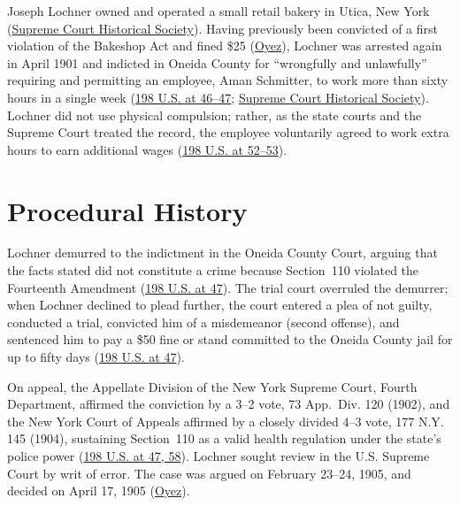 \documentclass[12pt]{article}
\begin{document}
Joseph Lochner owned and operated a small retail bakery in Utica, New York (\href{https://civics.supremecourthistory.org/article/lochner-v-new-york/}{Supreme Court Historical Society}). Having previously been convicted of a first violation of the Bakeshop Act and fined \$25 (\href{https://www.oyez.org/cases/1900-1940/198us45}{Oyez}), Lochner was arrested again in April 1901 and indicted in Oneida County for ``wrongfully and unlawfully'' requiring and permitting an employee, Aman Schmitter, to work more than sixty hours in a single week (\href{https://caselaw.findlaw.com/court/us-supreme-court/198/45.html}{198 U.S. at 46--47}; \href{https://civics.supremecourthistory.org/article/lochner-v-new-york/}{Supreme Court Historical Society}). Lochner did not use physical compulsion; rather, as the state courts and the Supreme Court treated the record, the employee voluntarily agreed to work extra hours to earn additional wages (\href{https://caselaw.findlaw.com/court/us-supreme-court/198/45.html}{198 U.S. at 52--53}).

\section{Procedural History}

Lochner demurred to the indictment in the Oneida County Court, arguing that the facts stated did not constitute a crime because Section~110 violated the Fourteenth Amendment (\href{https://caselaw.findlaw.com/court/us-supreme-court/198/45.html}{198 U.S. at 47}). The trial court overruled the demurrer; when Lochner declined to plead further, the court entered a plea of not guilty, conducted a trial, convicted him of a misdemeanor (second offense), and sentenced him to pay a \$50 fine or stand committed to the Oneida County jail for up to fifty days (\href{https://caselaw.findlaw.com/court/us-supreme-court/198/45.html}{198 U.S. at 47}).

On appeal, the Appellate Division of the New York Supreme Court, Fourth Department, affirmed the conviction by a 3--2 vote, 73 App.~Div. 120 (1902), and the New York Court of Appeals affirmed by a closely divided 4--3 vote, 177 N.Y. 145 (1904), sustaining Section~110 as a valid health regulation under the state's police power (\href{https://caselaw.findlaw.com/court/us-supreme-court/198/45.html}{198 U.S. at 47, 58}). Lochner sought review in the U.S. Supreme Court by writ of error. The case was argued on February 23--24, 1905, and decided on April 17, 1905 (\href{https://www.oyez.org/cases/1900-1940/198us45}{Oyez}).
\end{document}
